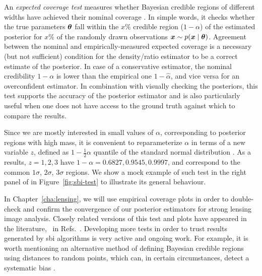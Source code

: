 An \emph{expected coverage test}  measures whether Bayesian credible regions of different widths have achieved their nominal coverage \cite{Hermans:2021rqv, Cole:2021gwr}. In simple words, it checks whether the true parameters $\bm{\theta}$ fall within the $x\%$ credible region ($1-\alpha$) of the estimated posterior for $x\%$ of the randomly drawn observations $\bm{x} \sim p(\bm{x}\mid\bm{\theta})$. Agreement between the nominal and empirically-measured expected coverage is a necessary (but not sufficient) condition for the density/ratio estimator to be a correct estimate of the posterior. In case of a conservative estimator, the nominal credibility $1-\alpha$ is lower than the empirical one $1-\hat\alpha$, and vice versa for an overconfident estimator. In combination with visually checking the posteriors, this test supports the accuracy of the posterior estimator and is also particularly useful when one does not have access to the ground truth against which to compare the results.

Since we are mostly interested in small values of $\alpha$, corresponding to posterior regions with high mass, it is convenient to reparameterize $\alpha$ in terms of a new variable $z$, defined as $1-\frac12 \alpha$ quantile of the standard normal distribution \cite{Cole:2021gwr}. As a results,  $z = 1, 2, 3$ have $1-\alpha = 0.6827, 0.9545, 0.9997$, and correspond to the common $1\sigma$, $2\sigma$, $3\sigma$ regions. We show a mock example of such test in the right panel of in Figure~\ref{fig:sbi-test} to illustrate its general behaviour.

In Chapter~\ref{cha:lensing}, we will use empirical coverage plots in order to double-check and confirm the convergence of our posterior estimators for strong lensing image analysis. Closely related versions of this test and plots have appeared in the literature, \eg~in Refs.~\cite{Dax:2021tsq,Karchev:2022xyn, Bhardwaj:2023xph}. Developing more tests in order to trust results generated by \gls*{sbi} algorithms is very active and ongoing work. For example, it is worth mentioning an alternative method of defining Bayesian credible regions using distances to random points, which can, in certain circumstances, detect a systematic bias \cite{lemos2023sampling}.




\bigskip

